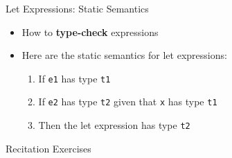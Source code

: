 \documentclass{beamer}
\begin{document}
    \begin{frame}{Let Expressions: Static Semantics}
        \begin{itemize}
            \item How to \textbf{type-check} expressions
            \item Here are the static semantics for let expressions:
            \begin{enumerate}
                \item If \texttt{e1} has type \texttt{t1}
                \item If \texttt{e2} has type \texttt{t2} given that \texttt{x} has type \texttt{t1}
                \item Then the let expression has type \texttt{t2}
            \end{enumerate}
        \end{itemize}    
    \end{frame}
    
    \begin{frame}{Recitation Exercises}
    \end{frame}
\end{document}
